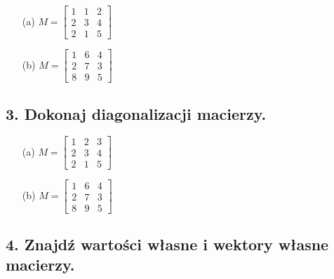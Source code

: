 \begin{enumerate}
    \item[(a)] \( M = \begin{bmatrix} 1 & 1 & 2 \\ 2 & 3 & 4 \\ 2 & 1 & 5 \end{bmatrix} \)
    
    \item[(b)] \( M = \begin{bmatrix} 1 & 6 & 4 \\ 2 & 7 & 3 \\ 8 & 9 & 5 \end{bmatrix} \)
\end{enumerate}

\subsection*{3. Dokonaj diagonalizacji macierzy.}

\begin{enumerate}
    \item[(a)] \( M = \begin{bmatrix} 1 & 2 & 3 \\ 2 & 3 & 4 \\ 2 & 1 & 5 \end{bmatrix} \)
    
    \item[(b)] \( M = \begin{bmatrix} 1 & 6 & 4 \\ 2 & 7 & 3 \\ 8 & 9 & 5 \end{bmatrix} \)
\end{enumerate}

\subsection*{4. Znajdź wartości własne i wektory własne macierzy.}


